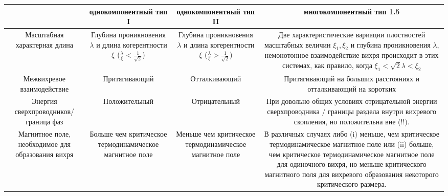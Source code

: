 \begin{table}[ht]
    \centering
    \begin{tabular}{|C{.18}|C{.22}|C{.22}|C{.35}|}
        \hline
        & однокомпонентный тип I & однокомпонентный тип II & 
        многокомпонентный тип 1.5 \\ \hline

        Масштабная характерная длина & Глубина проникновения \( \lambda \) и 
            длина когерентности \( \xi \) 
            (\( \frac{\lambda}{\xi} < \frac{1}{\sqrt{2}} \)) &
        Глубина проникновения \( \lambda \) и 
            длина когерентности \( \xi \) 
            (\( \frac{\lambda}{\xi} > \frac{1}{\sqrt{2}} \)) &
        Две характеристические вариации плостностей масштабных величин 
            \( \xi_1, \xi_2 \) и глубина проникновения \( \lambda \), 
            немонотонное взаимодействие вихря происходит в этих системах, как 
            правило, когда \( \xi_1 < \sqrt{2}\lambda < \xi_2 \) \\ \hline

        Межвихревое взаимодействие & Притягивающий & Отталкивающий & 
            Притягивающий на больших расстояниях и отталкивающий на коротких 
        \\ \hline

        Энергия сверхпроводников/граница фаз & Положительный & Отрицательный &
            При довольно общих условиях отрицательной энергии сверхпроводника / 
            границы раздела внутри вихревого скопления, но положительна вне (!!).

        \\ \hline

        Магнитное поле, необходимое для образования вихря & Больше чем 
            критическое термодинамическое магнитное поле & Меньше чем 
            критическое термодинамическое магнитное поле &
        В различных случаях либо (i) меньше, чем критическое термодинамическое 
            магнитное поле или (ii) больше, чем критическое термодинамическое
            магнитное поле для одиночного вихря, но меньше критического 
            магнитного поля для вихревого образования некоторого критического 
            размера.

        \\ \hline


\end{tabular}
\end{table}
